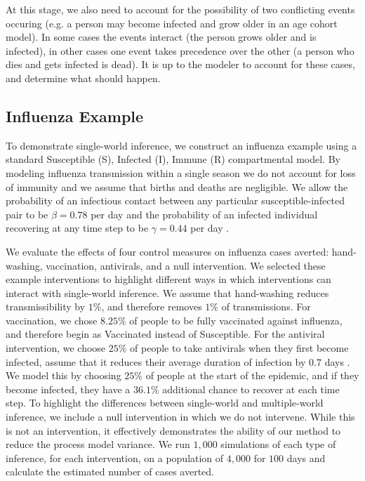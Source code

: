 \documentclass[PTRSB]{rsos}
\begin{document}
\begin{multicols}{2}
At this stage, we also need to account for the possibility of two conflicting events occuring (e.g. a person may become infected and grow older in an age cohort model).
In some cases the events interact (the person grows older and is infected), in other cases one event takes precedence over the other (a person who dies and gets infected is dead).
It is up to the modeler to account for these cases, and determine what should happen.


\subsection*{Influenza Example}
To demonstrate single-world inference, we construct an influenza example using a standard Susceptible (S), Infected (I), Immune (R) compartmental model.
By modeling influenza transmission within a single season we do not account for loss of immunity and we assume that births and deaths are negligible.
We allow the probability of an infectious contact between any particular susceptible-infected pair to be $\beta = 0.78$ per day and the probability of an infected individual recovering at any time step to be $\gamma = 0.44$ per day \cite{forsberg-white-et-al:2009}.

We evaluate the effects of four control measures on influenza cases averted: hand-washing, vaccination, antivirals, and a null intervention.
We selected these example interventions to highlight different ways in which interventions can interact with single-world inference.
We assume that hand-washing reduces transmissibility by $1\%$, and therefore removes $1\%$ of transmissions.
For vaccination, we chose $8.25\%$ of people to be fully vaccinated against influenza, and therefore begin as Vaccinated instead of Susceptible.
For the antiviral intervention, we choose $25\%$ of people to take antivirals when they first become infected, assume that it reduces their average duration of infection by $0.7$ days \cite{oseltamivir:2014}.
We model this by choosing $25\%$ of people at the start of the epidemic, and if they become infected, they have a $36.1\%$ additional chance to recover at each time step.
To highlight the differences between single-world and multiple-world inference, we include a null intervention in which we do not intervene.
While this is not an intervention, it effectively demonstrates the ability of our method to reduce the process model variance.
We run $1,000$ simulations of each type of inference, for each intervention, on a population of $4,000$ for $100$ days and calculate the estimated number of cases averted.


\end{multicols}
\end{document}

